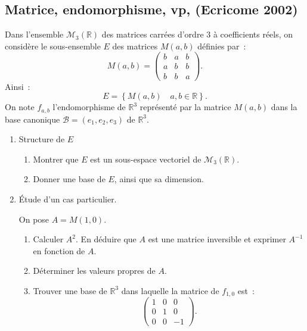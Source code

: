 \subsection{Matrice, endomorphisme, vp, (Ecricome 2002)}
\begin{exercice}

Dans l'ensemble $\mathcal{M}_{3}(\mathbb{R})$ des matrices carr\'{e}es
d'ordre $3$ \`{a} coefficients r\'{e}els, on consid\`{e}re le sous-ensemble $%
E$ des matrices $M(a,b)$ d\'{e}finies par~: 
\begin{equation*}
M(a,b)=\left( 
\begin{array}{ccc}
b & a & b \\ 
a & b & b \\ 
b & b & a%
\end{array}
\right) .
\end{equation*}
Ainsi~: 
\begin{equation*}
E=\left\{ M(a,b)\quad a,b\in \mathbb{R}\right\} .
\end{equation*}
On note $f_{a,b}$ l'endomorphisme de $\mathbb{R}^{3}$ repr\'{e}sent\'{e} par
la matrice $M(a,b)$ dans la base canonique $\mathcal{B}=(e_{1},e_{2},e_{3})$
de $\mathbb{R}^{3}$.

\begin{enumerate}


\item Structure de $E$


\begin{enumerate}
\item Montrer que $E$ est un sous-espace vectoriel de $\mathcal{M}_{3}(%
\mathbb{R})$.

\item Donner une base de $E$, ainsi que sa dimension.
\end{enumerate}







\item \'Etude d'un cas particulier.

On pose $A=M(1,0)$.

\begin{enumerate}
\item Calculer $A^{2}$. En d\'{e}duire que $A$ est une matrice inversible et
exprimer $A^{-1}$ en fonction de $A$.

\item D\'{e}terminer les valeurs propres de $A$.

\item Trouver une base de $\mathbb{R}^{3}$ dans laquelle la matrice de $%
f_{1,0}$ est~: 
\begin{equation*}
\left( 
\begin{array}{ccc}
1 & 0 & 0 \\ 
0 & 1 & 0 \\ 
0 & 0 & -1%
\end{array}
\right) .
\end{equation*}
\end{enumerate}


\end{enumerate}
\end{exercice}
